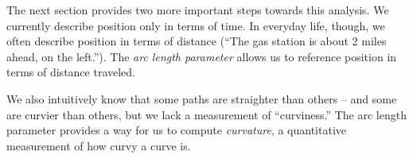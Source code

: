 The next section provides two more important steps towards this analysis. %
We currently describe position only in terms of time. In everyday life, though, we often describe position in terms of distance (``The gas station is about 2 miles ahead, on the left.''). The \emph{arc length parameter} allows us to reference position in terms of distance traveled. 

We also intuitively know that some paths are straighter than others -- and some are curvier than others, but we lack a measurement of ``curviness.'' The arc length parameter provides a way for us to compute \emph{curvature}, a quantitative measurement of how curvy a curve is.

